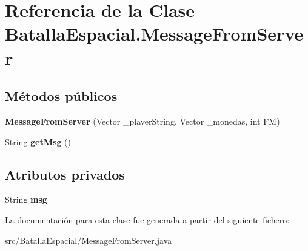 \hypertarget{classBatallaEspacial_1_1MessageFromServer}{
\section{Referencia de la Clase BatallaEspacial.MessageFromServer}
\label{classBatallaEspacial_1_1MessageFromServer}
}
\subsection*{Métodos públicos}
\begin{DoxyCompactItemize}
\item 
\hypertarget{classBatallaEspacial_1_1MessageFromServer_a7696ba75d83b0ea75b9e5ab20e80f491}{
{\bfseries MessageFromServer} (Vector \_\-playerString, Vector \_\-monedas, int FM)}
\label{classBatallaEspacial_1_1MessageFromServer_a7696ba75d83b0ea75b9e5ab20e80f491}

\item 
\hypertarget{classBatallaEspacial_1_1MessageFromServer_ac86e77f8b599a205c423d89bbb2ebf1e}{
String {\bfseries getMsg} ()}
\label{classBatallaEspacial_1_1MessageFromServer_ac86e77f8b599a205c423d89bbb2ebf1e}

\end{DoxyCompactItemize}
\subsection*{Atributos privados}
\begin{DoxyCompactItemize}
\item 
\hypertarget{classBatallaEspacial_1_1MessageFromServer_ae7d73f33c96c193cf8d0ce45f83e98c8}{
String {\bfseries msg}}
\label{classBatallaEspacial_1_1MessageFromServer_ae7d73f33c96c193cf8d0ce45f83e98c8}

\end{DoxyCompactItemize}


La documentación para esta clase fue generada a partir del siguiente fichero:\begin{DoxyCompactItemize}
\item 
src/BatallaEspacial/MessageFromServer.java\end{DoxyCompactItemize}
